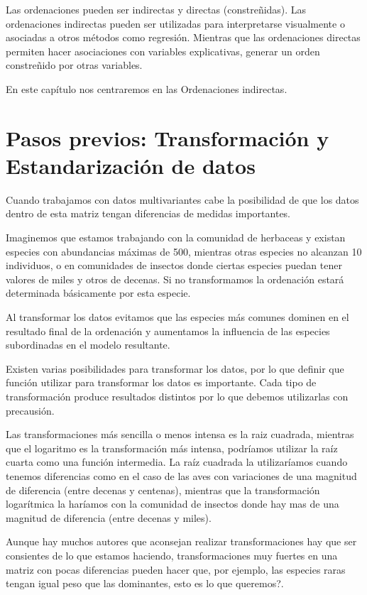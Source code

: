 \documentclass[]{book}
\begin{document}
Las ordenaciones pueden ser indirectas y directas (constreñidas). Las
ordenaciones indirectas pueden ser utilizadas para interpretarse
visualmente o asociadas a otros métodos como regresión. Mientras que las
ordenaciones directas permiten hacer asociaciones con variables
explicativas, generar un orden constreñido por otras variables.

En este capítulo nos centraremos en las Ordenaciones indirectas.

\section{Pasos previos: Transformación y Estandarización de
datos}\label{pasos-previos-transformacion-y-estandarizacion-de-datos}

Cuando trabajamos con datos multivariantes cabe la posibilidad de que
los datos dentro de esta matriz tengan diferencias de medidas
importantes.

Imaginemos que estamos trabajando con la comunidad de herbaceas y
existan especies con abundancias máximas de 500, mientras otras especies
no alcanzan 10 individuos, o en comunidades de insectos donde ciertas
especies puedan tener valores de miles y otros de decenas. Si no
transformamos la ordenación estará determinada básicamente por esta
especie.

Al transformar los datos evitamos que las especies más comunes dominen
en el resultado final de la ordenación y aumentamos la influencia de las
especies subordinadas en el modelo resultante.

Existen varias posibilidades para transformar los datos, por lo que
definir que función utilizar para transformar los datos es importante.
Cada tipo de transformación produce resultados distintos por lo que
debemos utilizarlas con precausión.

Las transformaciones más sencilla o menos intensa es la raiz cuadrada,
mientras que el logaritmo es la transformación más intensa, podríamos
utilizar la raíz cuarta como una función intermedia. La raíz cuadrada la
utilizaríamos cuando tenemos diferencias como en el caso de las aves con
variaciones de una magnitud de diferencia (entre decenas y centenas),
mientras que la transformación logarítmica la haríamos con la comunidad
de insectos donde hay mas de una magnitud de diferencia (entre decenas y
miles).

Aunque hay muchos autores que aconsejan realizar transformaciones hay
que ser consientes de lo que estamos haciendo, transformaciones muy
fuertes en una matriz con pocas diferencias pueden hacer que, por
ejemplo, las especies raras tengan igual peso que las dominantes, esto
es lo que queremos?.
\end{document}
